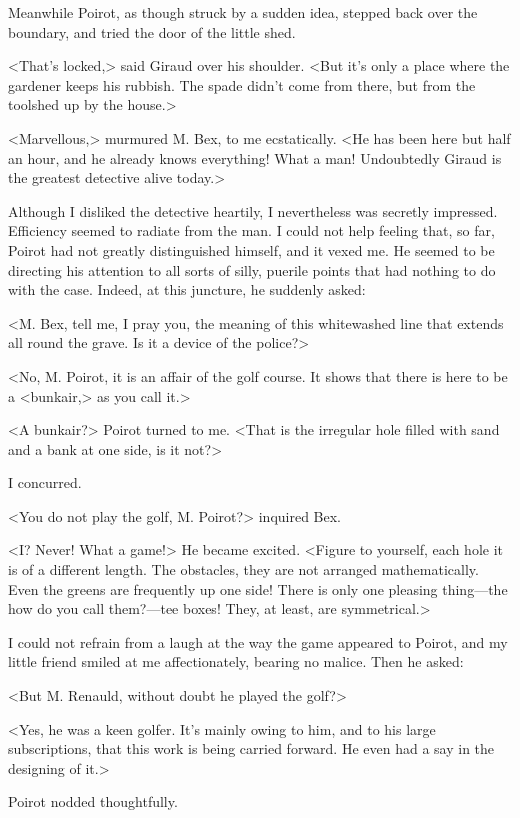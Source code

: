  Meanwhile Poirot, as though struck by a sudden idea, stepped back over the boundary, and tried the door of the little shed. 

 <That's locked,> said Giraud over his shoulder. <But it's only a place where the gardener keeps his rubbish. The spade didn't come from there, but from the toolshed up by the house.> 

 <Marvellous,> murmured M. Bex, to me ecstatically. <He has been here but half an hour, and he already knows everything! What a man! Undoubtedly Giraud is the greatest detective alive today.> 

 Although I disliked the detective heartily, I nevertheless was secretly impressed. Efficiency seemed to radiate from the man. I could not help feeling that, so far, Poirot had not greatly distinguished himself, and it vexed me. He seemed to be directing his attention to all sorts of silly, puerile points that had nothing to do with the case. Indeed, at this juncture, he suddenly asked: 

 <M. Bex, tell me, I pray you, the meaning of this whitewashed line that extends all round the grave. Is it a device of the police?> 

 <No, M. Poirot, it is an affair of the golf course. It shows that there is here to be a <bunkair,> as you call it.> 

 <A bunkair?> Poirot turned to me. <That is the irregular hole filled with sand and a bank at one side, is it not?> 

 I concurred. 

 <You do not play the golf, M. Poirot?> inquired Bex. 

 <I? Never! What a game!> He became excited. <Figure to yourself, each hole it is of a different length. The obstacles, they are not arranged mathematically. Even the greens are frequently up one side! There is only one pleasing thing—the how do you call them?—tee boxes! They, at least, are symmetrical.> 

 I could not refrain from a laugh at the way the game appeared to Poirot, and my little friend smiled at me affectionately, bearing no malice. Then he asked: 

 <But M. Renauld, without doubt he played the golf?> 

 <Yes, he was a keen golfer. It's mainly owing to him, and to his large subscriptions, that this work is being carried forward. He even had a say in the designing of it.> 

 Poirot nodded thoughtfully. 

